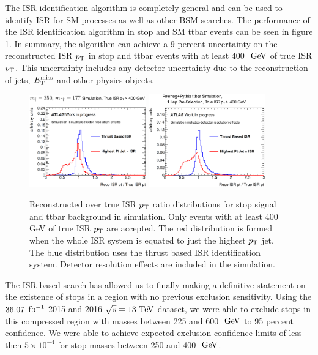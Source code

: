 \indent The ISR identification algorithm is completely general and can be used to identify ISR for SM processes as well as other BSM searches.  The performance of the ISR identification algorithm in stop and SM ttbar events can be seen in figure \ref{fig:ISRPerformanceIntro}.  In summary, the algorithm can achieve a 9 percent uncertainty on the reconstructed ISR $p_{\mathrm{T}}$ in stop and ttbar events with at least 400 $\gev$ of true ISR $p_{\mathrm{T}}$. This uncertainty includes any detector uncertainty due to the reconstruction of jets, $E_{\mathrm{T}}^{\mathrm{miss}}$ and other physics objects.  \\

\begin{figure}[h]
\centering
\includegraphics[width=0.45\textwidth]{./figures/strategy/ThrustAlgoEfficiency.eps}
\includegraphics[width=0.45\textwidth]{./figures/strategy/ThrustAlgoEfficiency_ttbar.eps}
\caption{Reconstructed over true ISR $p_{\mathrm{T}}$ ratio distributions for stop signal and ttbar background in simulation.  Only events with at least $400$ GeV of true ISR $p_{\mathrm{T}}$ are accepted.  The red distribution is formed when the whole ISR system is equated to just the highest $p_{\mathrm{T}}$ jet.  The blue distribution uses the thrust based ISR identification system. Detector resolution effects are included in the simulation. }
 \label{fig:ISRPerformanceIntro}
\end{figure}

\indent The ISR based search has allowed us to finally making a definitive statement on the existence of stops in a region with no previous exclusion sensitivity.  Using the $36.07$ $\mbox{fb$^{-1}$}$ 2015 and 2016 $\sqrt{s}=13 \tev$ dataset, we were able to exclude stops in this compressed region with masses between 225 and 600 $\gev$ to 95 percent confidence.  We were able to achieve expected exclusion confidence limits of less then $5 \times 10^{-4}$ for stop masses between 250 and 400 $\gev$.  \\


